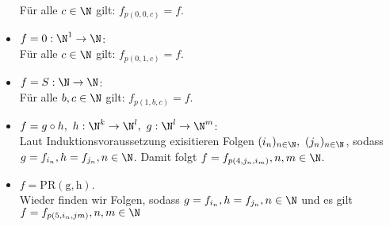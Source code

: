 \begin{solution}
\begin{itemize}
	Für alle $c \in \N$ gilt: $f_{p(0,0,c)} = f$.
	\item $f = 0: \N^1 \to \N$: \\
	Für alle $c \in \N$ gilt: $f_{p(0,1,c)} = f$.
	\item $f = S: \N \to \N$: \\
	Für alle $b,c \in \N$ gilt: $f_{p(1,b,c)} = f$.
	\item $f = g \circ h,\ h: \N^k \to \N^l,\ g: \N^l \to \N^m$: \\
	Laut Induktionsvoraussetzung exisitieren Folgen $(i_n)_{n\in \N},\ (j_n)_{n \in \N}$,
	sodass $g = f_{i_n}, h = f_{j_n}, n \in \N$. Damit folgt
	$f = f_{p(4,j_n,i_m)}, n,m \in \N$.
	\item $f = \mathrm{PR(g,h)}$. \\
	Wieder finden wir Folgen, sodass $g = f_{i_n}, h = f_{j_n}, n \in \N$ und es gilt
	$f = f_{p(5,i_n,jm)}, n,m \in \N$
\end{itemize}


\end{solution}
